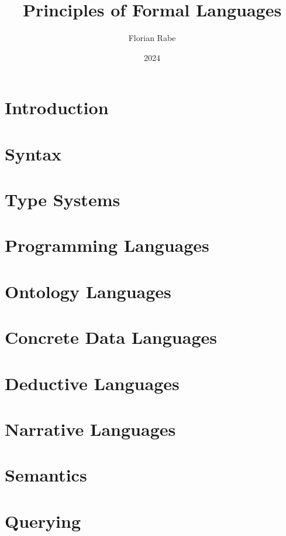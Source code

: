 \documentclass{beamer}
\begin{document}
\title{Principles of Formal Languages}
\author{Florian Rabe}
\date{2024}
\begin{frame}
    \titlepage
\end{frame}

\part{Introduction}


\part{Syntax}


\part{Type Systems}


\part{Programming Languages}


\part{Ontology Languages}


\part{Concrete Data Languages}


\part{Deductive Languages}


\part{Narrative Languages}


\part{Semantics}


\part{Querying}

\end{document}
